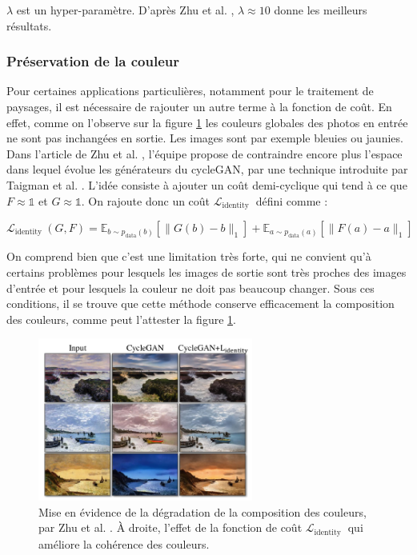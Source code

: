 $\lambda$ est un hyper-paramètre. D'après Zhu et al. \cite{zhu_unpaired_2018}, $\lambda \approx 10$ donne les meilleurs résultats.

\subsubsection{Préservation de la couleur}

Pour certaines applications particulières, notamment pour le traitement de paysages, il est nécessaire de rajouter un autre terme à la fonction de coût. En effet, comme on l'observe sur la figure \ref{Lident} les couleurs globales des photos en entrée ne sont pas inchangées en sortie. Les images sont par exemple bleuies ou  jaunies. Dans l'article de Zhu et al. \cite{zhu_unpaired_2018}, l'équipe propose de contraindre encore plus l'espace dans lequel évolue les générateurs du cycleGAN, par une technique introduite par Taigman et al. \cite{taigman_unsupervised_2016}. L'idée consiste à ajouter un coût demi-cyclique qui tend à ce que $ F \approx \mathbb{1} $ et $ G \approx \mathbb{1} $. On rajoute donc un coût $\mathcal{L}_{\text {identity }}$ défini comme :

$$\mathcal{L}_{\text {identity }}(G, F)=\mathbb{E}_{b \sim p_{\text {data}}(b)}\left[\|G(b)-b\|_{1}\right]+ \mathbb{E}_{a \sim p_{\text {data}}(a)}\left[\|F(a)-a\|_{1}\right]$$

On comprend bien que c'est une limitation très forte, qui ne convient qu'à certains problèmes pour lesquels les images de sortie sont très proches des images d'entrée et pour lesquels la couleur ne doit pas beaucoup changer. Sous ces conditions, il se trouve que cette méthode conserve efficacement la composition des couleurs, comme peut l'attester la figure \ref{Lident}. 

\begin{figure}[!h]
\centering
\includegraphics[width=200pt]{"images/cycle/Lident"}
\caption{Mise en évidence de la dégradation de la composition des couleurs, par Zhu et al. \cite{zhu_unpaired_2018}. À droite, l'effet de la fonction de coût $\mathcal{L}_{\text {identity }}$ qui améliore la cohérence des couleurs.}
\label{Lident}
\end{figure}



